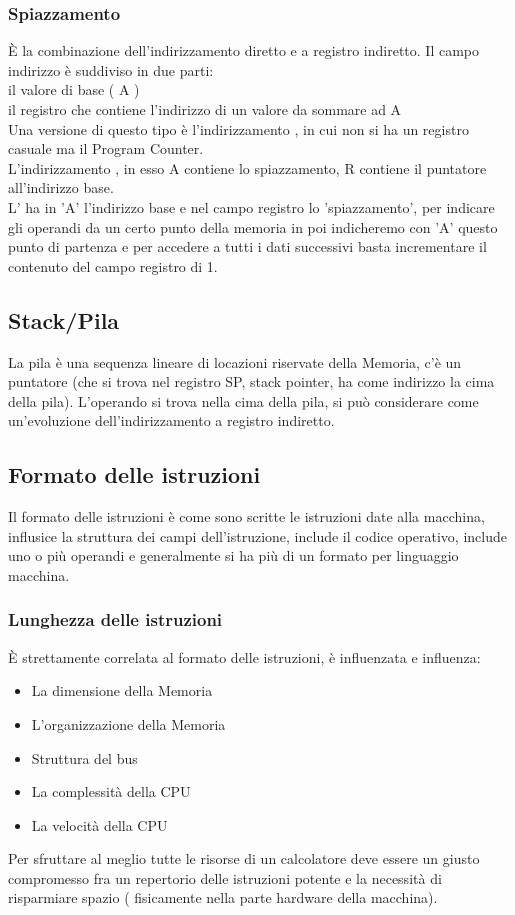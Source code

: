 \documentclass[arch.tex]{subfiles}
\begin{document}
\subsubsection{Spiazzamento}
È la combinazione dell'indirizzamento diretto e a registro indiretto. Il campo indirizzo
è suddiviso in due parti:\\
il valore di base ( A )\\
il registro che contiene l'indirizzo di un valore da sommare ad A\\
Una versione di questo tipo è l'indirizzamento , 
in cui non si ha un registro casuale ma il Program Counter.\\
L'indirizzamento , in esso A contiene lo spiazzamento, R contiene il 
puntatore all'indirizzo base.\\
L' ha in 'A' l'indirizzo base e nel campo registro lo 'spiazzamento',
per indicare gli operandi da un certo punto della memoria in poi indicheremo con 'A' 
questo punto di partenza e per accedere a tutti i dati successivi basta incrementare il contenuto
del campo registro di 1.

\subsection{Stack/Pila}
La pila è una sequenza lineare di locazioni riservate della Memoria, c'è un puntatore (che si 
trova nel registro SP, stack pointer, ha come indirizzo la cima della pila). L'operando
si trova nella cima della pila, si può considerare come un'evoluzione dell'indirizzamento a
registro indiretto.

\subsection{Formato delle istruzioni}%
\label{sub:formato_delle_istruzioni}
Il formato delle istruzioni è come sono scritte le istruzioni date alla macchina, influsice
la struttura dei campi dell'istruzione, include il codice operativo, include uno o più operandi
e generalmente si ha più di un formato per linguaggio macchina.

\subsubsection{Lunghezza delle istruzioni}
È strettamente correlata al formato delle istruzioni, è influenzata e influenza:

\begin{itemize}
	\item La dimensione della Memoria
	\item L'organizzazione della Memoria
	\item Struttura del bus
	\item La complessità della CPU
	\item La velocità della CPU
\end{itemize}
Per sfruttare al meglio tutte le risorse di un calcolatore deve essere un giusto compromesso
fra un repertorio delle istruzioni potente e la necessità di risparmiare spazio ( fisicamente
nella parte hardware della macchina). \\
\end{document}
